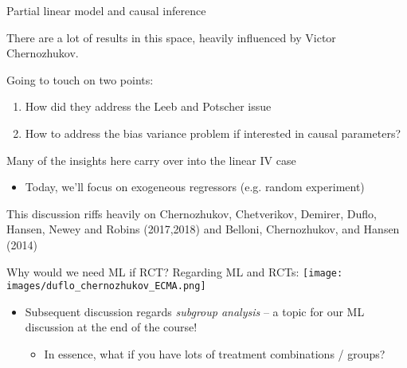 \documentclass[notes,11pt, aspectratio=169]{beamer}
\newenvironment{wideitemize}{\itemize\addtolength{\itemsep}{10pt}}{\enditemize}
\begin{document}
\begin{frame}{Partial linear model and causal inference}
  \begin{wideitemize}
  \item There are a lot of results in this space, heavily influenced
    by Victor Chernozhukov.
    
  \item  Going to touch on two points:
  \begin{enumerate}
  \item How did they address the Leeb and Potscher issue
  \item How to address the bias variance problem if interested in causal parameters?
  \end{enumerate}
\item Many of the insights here carry over into the linear IV case
  \begin{itemize}
  \item Today, we'll focus on exogeneous regressors (e.g. random
    experiment)
  \end{itemize}
\item This discussion riffs heavily on Chernozhukov, Chetverikov,
  Demirer, Duflo, Hansen, Newey and Robins (2017,2018) and Belloni,
  Chernozhukov, and Hansen (2014)
  \end{wideitemize}
\end{frame}

\begin{frame}{Why would we need ML if RCT?}
  Regarding ML and RCTs:
  \texttt{[image: images/duflo\_chernozhukov\_ECMA.png]}
  
  \begin{itemize}
  \item   Subsequent discussion regards \emph{subgroup analysis} -- a topic
    for our ML discussion at the end of the course!
    \begin{itemize}
    \item In essence, what if you have lots of treatment combinations /
      groups?
    \end{itemize}
  \end{itemize}
\end{frame}
\end{document}
